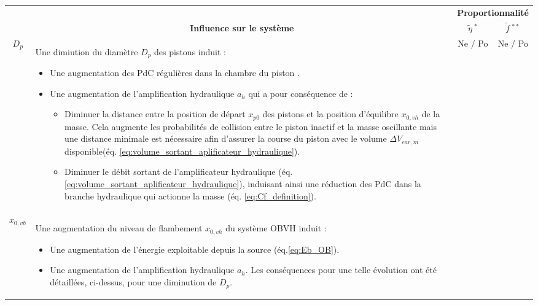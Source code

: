 \newpage %
\begin{landscape}
\begin{table}[!htbp]
\centering
\footnotesize	
	\begin{tabular}{ c | m{19cm} | c | c }			
\toprule
\rowcolor{blue!10}    	
\multicolumn{1}{c}{} & \multicolumn{1}{c}{} & \multicolumn{2}{c}{\textbf{Proportionnalité}}\\
\cline{3-4}
\rowcolor{blue!10}    
\multicolumn{1}{c}{\multirow{-2}{*}{\textbf{Symbole}}}												&
\multicolumn{1}{c}{\multirow{-2}{*}{\textbf{Influence sur le système}}}								& 
\multicolumn{1}{c}{\textbf{$\tilde{\eta}~^{*}$}} & \multicolumn{1}{c}{\textbf{$\tilde{f}~^{**}$}}	\\ 
\midrule
\rowcolor{black!8} 
$D_p$ & Une dimiution du diamètre $D_p$ des pistons induit :
\begin{itemize}[label=$\bullet$] 
	\item Une augmentation des PdC régulières dans la chambre du piston \cite{Hussian2008}.
	\item Une augmentation de l'amplification hydraulique $a_h$ qui a pour conséquence de :
		\begin{itemize}[label=$\circ$] 
			\item Diminuer la distance entre la position de départ $x_{p0}$ des pistons et la position d'équilibre $x_{0,vh}$ de la masse. Cela augmente les probabilités de collision entre le piston inactif et la masse oscillante mais une distance minimale est nécessaire afin d'assurer la course du piston avec le volume $\Delta V_{ear,m}$ disponible(éq. \ref{eq:volume_sortant_aplificateur_hydraulique}).
  			\item Diminuer le débit sortant de l'amplificateur hydraulique (éq. \ref{eq:volume_sortant_aplificateur_hydraulique}), induisant ainsi une réduction des PdC dans la branche hydraulique qui actionne la masse (éq. \ref{eq:Cf_definition}).
		\end{itemize}
\end{itemize}
& \textcolor{Rouge1}{Ne} / \textcolor{mygreen2}{Po}  	&	\textcolor{Rouge1}{Ne} / \textcolor{mygreen2}{Po}  \\ 
$x_{0,vh}$ & Une augmentation du niveau de flambement $x_{0,vh}$ du système OBVH induit :
\begin{itemize}[label=$\bullet$] 
	\item Une augmentation de l'énergie exploitable depuis la source (éq.\ref{eq:Eb_OB}).
	\item Une augmentation de l'amplification hydraulique $a_h$. Les conséquences pour une telle évolution ont été détaillées, ci-dessus, pour une diminution de $D_p$.

\end{itemize}
\end{tabular}
\end{table}
\end{landscape}
